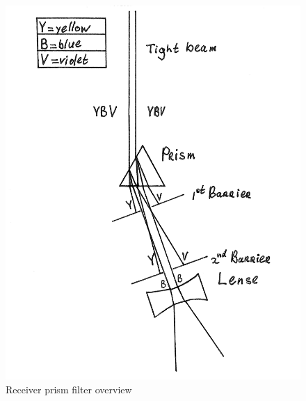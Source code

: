 \begin{figure}[ht!]
\centering
\includegraphics[scale = 0.8]{chapters/img/Prism.png}
\caption{Receiver prism filter overview}
\label{fig:prism}
\end{figure} 


